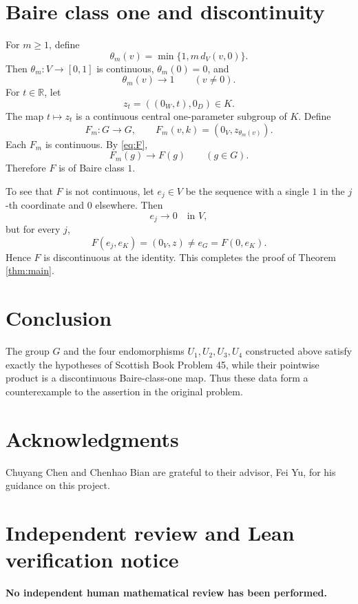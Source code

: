 \documentclass[11pt]{article}
\theoremstyle{remark}
\newcommand{\R}{\mathbb R}
\begin{document}
\section{Baire class one and discontinuity}

For $m\ge1$, define
\[
\theta_m(v)=\min\{1,m\,d_V(v,0)\}.
\]
Then $\theta_m:V\to[0,1]$ is continuous, $\theta_m(0)=0$, and
\[
\theta_m(v)\longrightarrow1
\qquad(v\ne0).
\]
For $t\in\R$, let
\[
z_t=\left((0_W,t),0_D\right)\in K.
\]
The map $t\mapsto z_t$ is a continuous central one-parameter subgroup of $K$. Define
\[
F_m:G\longrightarrow G,
\qquad
F_m(v,k)=(0_V,z_{\theta_m(v)}).
\]
Each $F_m$ is continuous. By \eqref{eq:F},
\[
F_m(g)\longrightarrow F(g)
\qquad(g\in G).
\]
Therefore $F$ is of Baire class $1$.

To see that $F$ is not continuous, let $e_j\in V$ be the sequence with a single $1$ in the $j$-th coordinate and $0$ elsewhere. Then
\[
e_j\longrightarrow0
\quad\text{in }V,
\]
but for every $j$,
\[
F(e_j,e_K)=(0_V,z)\ne e_G=F(0,e_K).
\]
Hence $F$ is discontinuous at the identity. This completes the proof of Theorem \ref{thm:main}.

\section{Conclusion}

The group $G$ and the four endomorphisms $U_1,U_2,U_3,U_4$ constructed above satisfy exactly the hypotheses of Scottish Book Problem 45, while their pointwise product is a discontinuous Baire-class-one map. Thus these data form a counterexample to the assertion in the original problem.


\section*{Acknowledgments}
Chuyang Chen and Chenhao Bian are grateful to their advisor, Fei Yu, for his guidance on this project.

\section*{Independent review and Lean verification notice}
\begingroup
\small
\begin{center}
\begin{minipage}{0.94\linewidth}
\centering
\textbf{\large No independent human mathematical review has been performed.}
\end{minipage}
\end{center}
\end{document}
